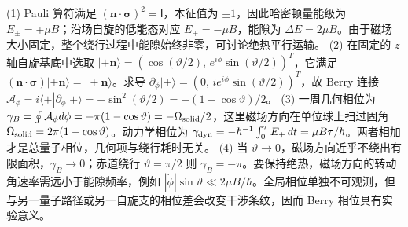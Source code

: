 (1) Pauli 算符满足 \((\boldsymbol n\cdot\boldsymbol\sigma)^2=\mathsf I\)，本征值为 \(\pm1\)，因此哈密顿量能级为 \(E_\pm=\mp\mu B\)；沿场自旋的低能态对应 \(E_+=-\mu B\)，能隙为 \(\Delta E=2\mu B\)。由于磁场大小固定，整个绕行过程中能隙始终非零，可讨论绝热平行运输。
(2) 在固定的 \(z\) 轴自旋基底中选取 \(|+\boldsymbol n\rangle=(\cos(\vartheta/2),\,e^{i\phi}\sin(\vartheta/2))^T\)，它满足 \((\boldsymbol n\cdot\boldsymbol\sigma)|+\boldsymbol n\rangle=|+\boldsymbol n\rangle\)。求导 \(\partial_\phi|+\rangle=(0,\,ie^{i\phi}\sin(\vartheta/2))^T\)，故 Berry 连接 \(\mathcal A_\phi=i\langle+|\partial_\phi|+\rangle=-\sin^2(\vartheta/2)=-(1-\cos\vartheta)/2\)。
(3) 一周几何相位为 \(\gamma_B=\oint\mathcal A_\phi d\phi=-\pi(1-\cos\vartheta)=-\Omega_{\rm solid}/2\)，这里磁场方向在单位球上扫过固角 \(\Omega_{\rm solid}=2\pi(1-\cos\vartheta)\)。动力学相位为 \(\gamma_{\rm dyn}=-\hbar^{-1}\int_0^\tau E_+\,dt=\mu B\tau/\hbar\)。两者相加才是总量子相位，几何项与绕行耗时无关。
(4) 当 \(\vartheta\to0\)，磁场方向近乎不绕出有限面积，\(\gamma_B\to0\)；赤道绕行 \(\vartheta=\pi/2\) 则 \(\gamma_B=-\pi\)。要保持绝热，磁场方向的转动角速率需远小于能隙频率，例如 \(|\dot\phi|\sin\vartheta\ll2\mu B/\hbar\)。全局相位单独不可观测，但与另一量子路径或另一自旋支的相位差会改变干涉条纹，因而 Berry 相位具有实验意义。
